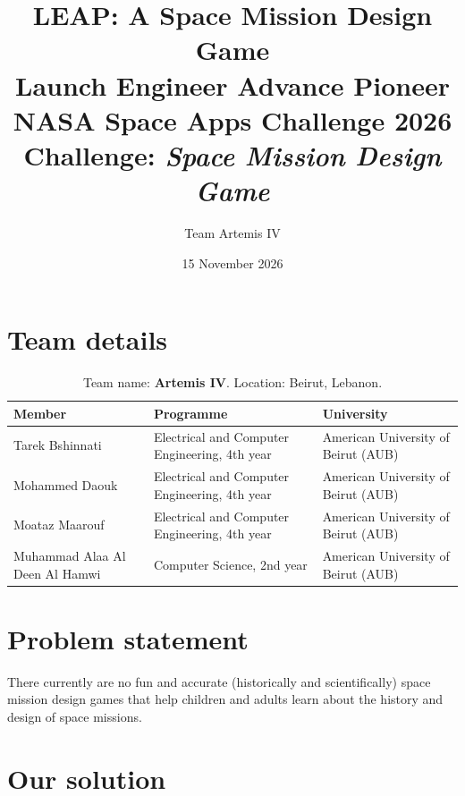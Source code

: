 \documentclass[11pt,a4paper]{article}
\title{\textbf{LEAP: A Space Mission Design Game}\\[4pt]
  \large Launch \textperiodcentered{} Engineer \textperiodcentered{} Advance \textperiodcentered{} Pioneer\\[10pt]
  \normalsize NASA Space Apps Challenge 2026 \textperiodcentered{} Challenge: \emph{Space Mission Design Game}}
\author{Team Artemis IV}
\date{15 November 2026}
\begin{document}
\maketitle



\tableofcontents
\bigskip

\section{Team details}

\begin{table}[H]
\centering
\begin{tabularx}{\textwidth}{@{}l L L@{}}
\toprule
\textbf{Member} & \textbf{Programme} & \textbf{University} \\
\midrule
Tarek Bshinnati & Electrical and Computer Engineering, 4th year & American University of Beirut (AUB) \\
Mohammed Daouk & Electrical and Computer Engineering, 4th year & American University of Beirut (AUB) \\
Moataz Maarouf & Electrical and Computer Engineering, 4th year & American University of Beirut (AUB) \\
Muhammad Alaa Al Deen Al Hamwi & Computer Science, 2nd year & American University of Beirut (AUB) \\
\bottomrule
\end{tabularx}
\caption*{Team name: \textbf{Artemis IV}. Location: Beirut, Lebanon.}
\end{table}

\section{Problem statement}

There currently are no fun and accurate (historically and scientifically) space mission design games that help
children and adults learn about the history and design of space missions.

\section{Our solution}
\end{document}
